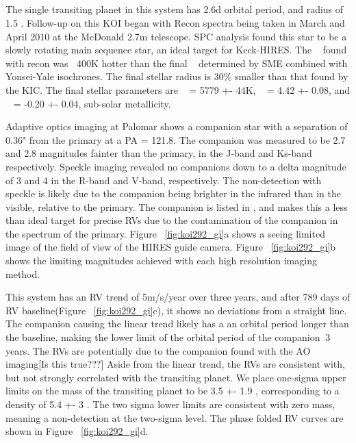 \documentclass{emulateapj}
\begin{document}


\subsection{\koitwoninetwo} %

The single transiting planet in this system has 2.6d orbital period, and radius of 1.5 \rearthe. Follow-up on this KOI began with Recon spectra being taken in March and April 2010 at the McDonald 2.7m telescope. SPC analysis found this star to be a slowly rotating main sequence star, an ideal target for Keck-HIRES. The \teff~ found with recon was $~$ 400K hotter than the final \teff~ determined by SME combined with Yonsei-Yale isochrones. The final stellar radius is 30\% smaller than that found by the KIC.  The final stellar parameters are \teff~ = 5779 +- 44K, \logg~ = 4.42 +- 0.08, and \feh~ = -0.20 +- 0.04, sub-solar metallicity.

Adaptive optics imaging at Palomar shows a companion star with a separation of 0.36" from the primary at a PA = 121.8. The companion was measured to be 2.7 and 2.8 magnitudes fainter than the primary, in the J-band and Ks-band respectively. Speckle imaging revealed no companions down to a delta magnitude of 3 and  4 in the R-band and  V-band, respectively. The non-detection with speckle is likely due to the companion being brighter in the infrared than in the visible, relative to the primary. The companion is listed in \cite{Adams2012}, and makes this a less than ideal target for precise RVs due to the contamination of the companion in the spectrum of the primary.  Figure ~\ref{fig:koi292_gi}a shows a seeing limited image of the field of view of the HIRES guide camera.  Figure ~\ref{fig:koi292_gi}b shows the limiting magnitudes achieved with each high resolution imaging method.  %

This system has an RV trend of 5m/s/year over three years, and after 789 days of RV baseline(Figure ~\ref{fig:koi292_gi}c), it shows no deviations from a straight line. The companion causing the linear trend likely has a an orbital period longer than  the baseline, making the lower limit of the orbital period of the companion $~3$  years. The RVs are potentially due to the companion found with the AO imaging[Is this true???]  Aside from the linear trend, the  RVs are consistent with, but not strongly correlated with the transiting planet. We place one-sigma upper limits on the mass of the transiting planet to be 3.5 +- 1.9 \mearthe, corresponding to a density of 5.4 +- 3 \gcc. The two sigma lower limits are consistent with zero mass, meaning a non-detection at the two-sigma level. The phase folded RV curves are shown in Figure ~\ref{fig:koi292_gi}d.
\end{document}
